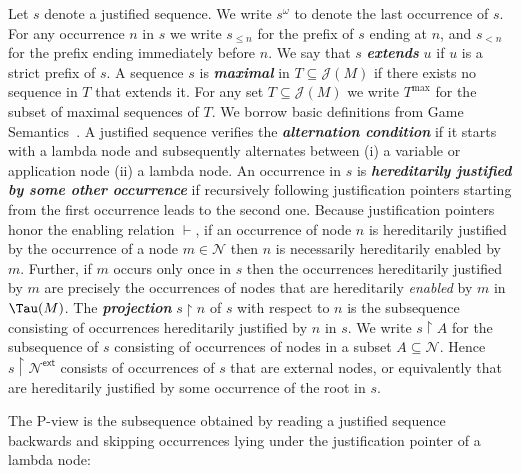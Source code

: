 \documentclass[xchauthor,chkrefs,GCNS,amsmath,amsthm,rotating,leaveRGB]{tcsg}
\renewcommand{\index}[1]{}
\theoremstyle{plain}
\theoremstyle{definition}
\newcommand{\Nodes}{\mathcal{N}}
\newcommand{\enables}{\vdash}
\newcommand{\ctree}{\Tau}
\newcommand{\ExternalNodes}{\Nodes^{\mathsf{ext}}}
\def\justseqset{\mathcal{J}}
\begin{document}
Let $s$ denote a justified sequence. We write $s^\omega $ to denote the last
occurrence of $s$. For any occurrence $n$ in $s$ we write $s_{\leq n}$ for
the prefix of $s$ ending at $n$, and $s_{<n}$ for the prefix ending
immediately before $n$. We say that $s$
\textbf{\emph{extends}}\index{extends} $u$ if $u$ is a strict prefix of $s$.
A sequence $s$ is \textbf{\emph{maximal}}\index{maximal} in $T\subseteq
\justseqset (M)$ if there exists no sequence in $T$ that extends it. For any set
$T\subseteq \justseqset (M)$ we write $T^{\max }$ for the subset of maximal
sequences of $T$. We borrow basic definitions from Game
Semantics~\cite{Abr02}. A justified sequence verifies the
\textbf{\emph{alternation condition}}\index{alternation condition} if it
starts with a lambda node and subsequently alternates between (i) a variable
or application node (ii) a lambda node. An occurrence in $s$ is
\textbf{\emph{hereditarily justified by some other
occurrence}}\index{hereditarily justified by some other occurrence} if
recursively following justification pointers starting from the first
occurrence leads to the second one. Because justification pointers honor the
enabling relation $\enables $, if an occurrence of node $n$ is hereditarily
justified by the occurrence of a node $m\in \Nodes $ then $n$ is necessarily
hereditarily enabled by $m$. Further, if $m$ occurs only once in $s$ then the
occurrences hereditarily justified by $m$ are precisely the occurrences of
nodes that are hereditarily \emph{enabled} by $m$ in $\ctree (M)$. The
\textbf{\emph{projection}}\index{projection} $s\upharpoonright  n$ of $s$
with respect to $n$ is the subsequence consisting of occurrences hereditarily
justified by $n$ in $s$. We write $s \upharpoonright  A$ for the subsequence
of $s$ consisting of occurrences of nodes in a subset $A \subseteq \Nodes $.
Hence $s\upharpoonright  \ExternalNodes $ consists of occurrences of $s$ that
are external nodes, or equivalently that are hereditarily justified by some
occurrence of the root in $s$.

The P-view is the subsequence obtained by reading a justified sequence
backwards and skipping occurrences lying under the justification pointer of a
lambda node:
\end{document}
